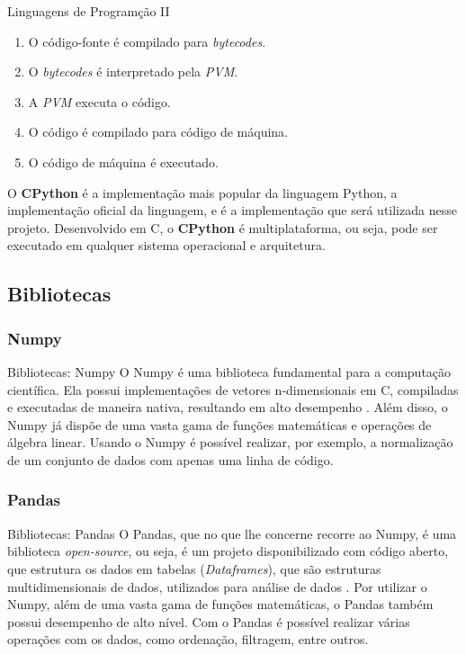 \begin{frame}{Linguagens de Programção II}
	\begin{enumerate}
		\item O código-fonte é compilado para \textit{bytecodes}.
		\item O \textit{bytecodes} é interpretado pela \textit{PVM}.
		\item A \textit{PVM} executa o código.
		\item O código é compilado para código de máquina.
		\item O código de máquina é executado.
	\end{enumerate}

	\bigskip

	\quad O \textbf{CPython} é a implementação mais popular da linguagem Python, a implementação oficial da linguagem, e é a implementação que será utilizada nesse projeto. Desenvolvido em C, o \textbf{CPython} é multiplataforma, ou seja, pode ser executado em qualquer sistema operacional e arquitetura.
\end{frame}

\subsection{Bibliotecas}
\label{subsec:bibliotecas}

\subsubsection{Numpy}
\label{subsubsec:numpy}

\begin{frame}{Bibliotecas: Numpy}
	O Numpy é uma biblioteca fundamental para a computação científica. Ela possui implementações de vetores n-dimensionais em C, compiladas e executadas de maneira nativa, resultando em alto desempenho \cite{numpy}. Além disso, o Numpy já dispõe de uma vasta gama de funções matemáticas e operações de álgebra linear. Usando o Numpy é possível realizar, por exemplo, a normalização de um conjunto de dados com apenas uma linha de código.
\end{frame}

\subsubsection{Pandas}
\label{subsubsec:pandas}

\begin{frame}{Bibliotecas: Pandas}
	O Pandas, que no que lhe concerne recorre ao Numpy, é uma biblioteca \textit{open-source}, ou seja, é um projeto disponibilizado com código aberto, que estrutura os dados em tabelas (\textit{Dataframes}), que são estruturas multidimensionais de dados, utilizados para análise de dados \cite{pandas}. Por utilizar o Numpy, além de uma vasta gama de funções matemáticas, o Pandas também possui desempenho de alto nível. Com o Pandas é possível realizar várias operações com os dados, como ordenação, filtragem, entre outros.
\end{frame}

